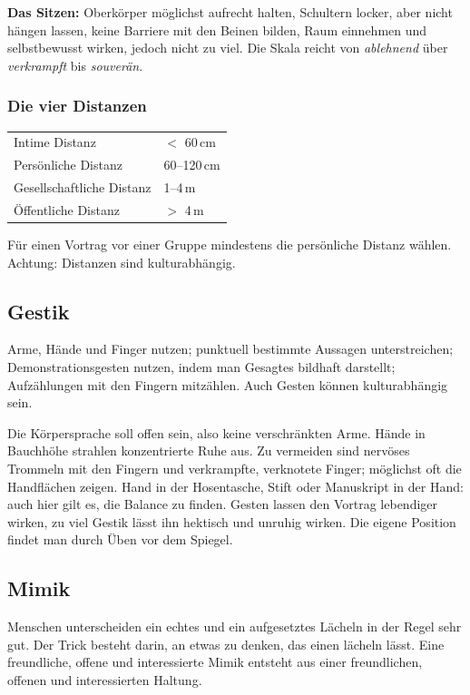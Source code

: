 \documentclass[12pt, a4paper]{article}
\begin{document}
\textbf{Das Sitzen:} Oberkörper möglichst aufrecht halten, Schultern locker,
aber nicht hängen lassen, keine Barriere mit den Beinen bilden, Raum
einnehmen und selbstbewusst wirken, jedoch nicht zu viel. Die Skala reicht
von \emph{ablehnend} über \emph{verkrampft} bis \emph{souverän}.

\subsubsection{Die vier Distanzen}

\begin{center}
\begin{tabular}{ll}
Intime Distanz & $<$ 60\,cm\\
Persönliche Distanz & 60--120\,cm\\
Gesellschaftliche Distanz & 1--4\,m\\
Öffentliche Distanz & $>$ 4\,m\\
\end{tabular}
\end{center}

Für einen Vortrag vor einer Gruppe mindestens die persönliche Distanz wählen.
Achtung: Distanzen sind kulturabhängig.

\subsection{Gestik}

Arme, Hände und Finger nutzen; punktuell bestimmte Aussagen unterstreichen;
Demonstrationsgesten nutzen, indem man Gesagtes bildhaft darstellt;
Aufzählungen mit den Fingern mitzählen. Auch Gesten können kulturabhängig
sein.

Die Körpersprache soll offen sein, also keine verschränkten Arme. Hände in
Bauchhöhe strahlen konzentrierte Ruhe aus. Zu vermeiden sind nervöses
Trommeln mit den Fingern und verkrampfte, verknotete Finger; möglichst oft
die Handflächen zeigen. Hand in der Hosentasche, Stift oder Manuskript in der
Hand: auch hier gilt es, die Balance zu finden. Gesten lassen den Vortrag
lebendiger wirken, zu viel Gestik lässt ihn hektisch und unruhig wirken. Die
eigene Position findet man durch Üben vor dem Spiegel.

\subsection{Mimik}

Menschen unterscheiden ein echtes und ein aufgesetztes Lächeln in der Regel
sehr gut. Der Trick besteht darin, an etwas zu denken, das einen lächeln
lässt. Eine freundliche, offene und interessierte Mimik entsteht aus einer
freundlichen, offenen und interessierten Haltung.
\end{document}
